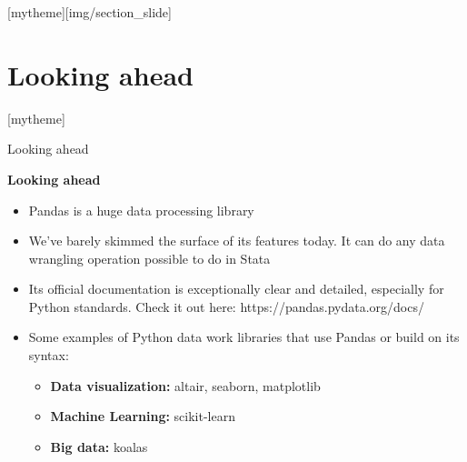 \documentclass[aspectratio=169]{beamer}
\newcommand{\sectionpic}[2]{
	\setbeamertemplate{section page}[mytheme][#2]
	\section{#1}
	\setbeamertemplate{section page}[mytheme]
}
\begin{document}
\sectionpic{Looking ahead}{img/section_slide}

\begin{frame}{Looking ahead}

	\textbf{Looking ahead}

	\begin{itemize}
		\item Pandas is a huge data processing library
		\item We've barely skimmed the surface of its features today. It can do any data wrangling operation possible to do in Stata
		\item Its official documentation is exceptionally clear and detailed, especially for Python standards. Check it out here: https://pandas.pydata.org/docs/
		\item Some examples of Python data work libraries that use Pandas or build on its syntax:
		\begin{itemize}
			\item \textbf{Data visualization:} altair, seaborn, matplotlib
			\item \textbf{Machine Learning:} scikit-learn
			\item \textbf{Big data:} koalas
		\end{itemize}
	\end{itemize}

\end{frame}
\end{document}
